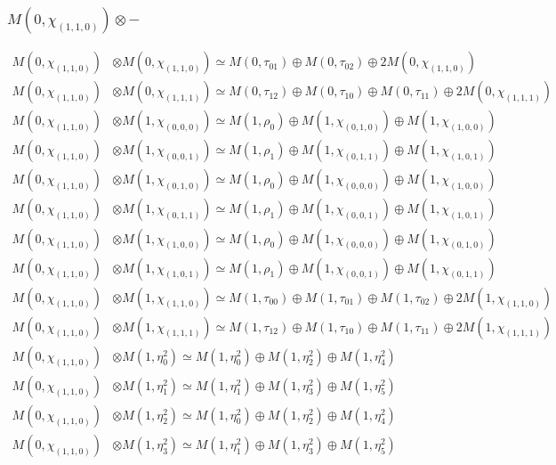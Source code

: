 \subsubsection{$ M(0,\chi_{(1,1,0)})\otimes -$}
\begin{align*}
M(0,\chi_{(1,1,0)}) &\otimes M(0,\chi_{(1,1,0)}) \simeq M(0,\tau_{01}) \oplus M(0,\tau_{02}) \oplus 2 M(0,\chi_{(1,1,0)}) \\
M(0,\chi_{(1,1,0)}) &\otimes M(0,\chi_{(1,1,1)}) \simeq M(0,\tau_{12}) \oplus M(0,\tau_{10}) \oplus M(0,\tau_{11}) \oplus 2 M(0,\chi_{(1,1,1)}) \\
M(0,\chi_{(1,1,0)}) &\otimes M(1,\chi_{(0,0,0)}) \simeq M(1,\rho_{0}) \oplus M(1,\chi_{(0,1,0)}) \oplus M(1,\chi_{(1,0,0)}) \\
M(0,\chi_{(1,1,0)}) &\otimes M(1,\chi_{(0,0,1)}) \simeq M(1,\rho_{1}) \oplus M(1,\chi_{(0,1,1)}) \oplus M(1,\chi_{(1,0,1)}) \\
M(0,\chi_{(1,1,0)}) &\otimes M(1,\chi_{(0,1,0)}) \simeq M(1,\rho_{0}) \oplus M(1,\chi_{(0,0,0)}) \oplus M(1,\chi_{(1,0,0)}) \\
M(0,\chi_{(1,1,0)}) &\otimes M(1,\chi_{(0,1,1)}) \simeq M(1,\rho_{1}) \oplus M(1,\chi_{(0,0,1)}) \oplus M(1,\chi_{(1,0,1)}) \\
M(0,\chi_{(1,1,0)}) &\otimes M(1,\chi_{(1,0,0)}) \simeq M(1,\rho_{0}) \oplus M(1,\chi_{(0,0,0)}) \oplus M(1,\chi_{(0,1,0)}) \\
M(0,\chi_{(1,1,0)}) &\otimes M(1,\chi_{(1,0,1)}) \simeq M(1,\rho_{1}) \oplus M(1,\chi_{(0,0,1)}) \oplus M(1,\chi_{(0,1,1)}) \\
M(0,\chi_{(1,1,0)}) &\otimes M(1,\chi_{(1,1,0)}) \simeq M(1,\tau_{00}) \oplus M(1,\tau_{01}) \oplus M(1,\tau_{02}) \oplus 2 M(1,\chi_{(1,1,0)}) \\
M(0,\chi_{(1,1,0)}) &\otimes M(1,\chi_{(1,1,1)}) \simeq M(1,\tau_{12}) \oplus M(1,\tau_{10}) \oplus M(1,\tau_{11}) \oplus 2 M(1,\chi_{(1,1,1)}) \\
M(0,\chi_{(1,1,0)}) &\otimes M(1,\eta^{2}_{0}) \simeq M(1,\eta^{2}_{0}) \oplus M(1,\eta^{2}_{2}) \oplus M(1,\eta^{2}_{4}) \\
M(0,\chi_{(1,1,0)}) &\otimes M(1,\eta^{2}_{1}) \simeq M(1,\eta^{2}_{1}) \oplus M(1,\eta^{2}_{3}) \oplus M(1,\eta^{2}_{5}) \\
M(0,\chi_{(1,1,0)}) &\otimes M(1,\eta^{2}_{2}) \simeq M(1,\eta^{2}_{0}) \oplus M(1,\eta^{2}_{2}) \oplus M(1,\eta^{2}_{4}) \\
M(0,\chi_{(1,1,0)}) &\otimes M(1,\eta^{2}_{3}) \simeq M(1,\eta^{2}_{1}) \oplus M(1,\eta^{2}_{3}) \oplus M(1,\eta^{2}_{5}) \\

\end{align*}
